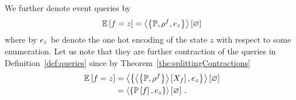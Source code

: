We further denote event queries by
	\[  \mathbb{E}\left[f=z\right] = \left\langle \left\{\mathbb{P},\rho^{f},e_{z}\right\}\right\rangle \left[ \varnothing \right]\]
where by $e_{z}$ be denote the one hot encoding of the state $z$ with respect to some enumeration.
Let us note that they are further contraction of the queries in Definition~\ref{def:queries} since by Theorem~\ref{the:splittingContractions}
\begin{align*}
	 \mathbb{E}\left[f=z\right] 
	& =  \left\langle \left\{ \left\langle \left\{\mathbb{P},\rho^{f}\right\}\right\rangle \left[ X_{f} \right] ,e_{z}\right\}\right\rangle \left[ \varnothing \right]\\
	& =  \left\langle \left\{ \mathbb{P}\left[f\right] ,e_{z}\right\}\right\rangle \left[ \varnothing \right] \, . 
\end{align*}


%
%
%






